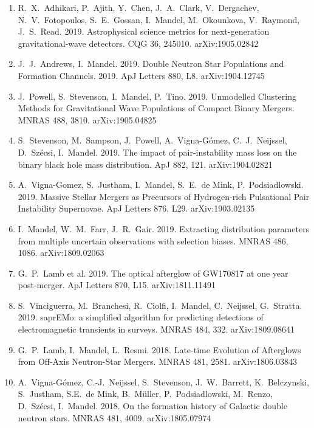 \documentclass[margin,line]{res}
\begin{document}
\begin{resume}
\begin{enumerate}
\item R.~X.~Adhikari, P.~Ajith, Y.~Chen, J.~A.~Clark, V.~Dergachev, N.~V.~Fotopoulos, S.~E.~Gossan, I.~Mandel, M.~Okounkova, V.~Raymond, J.~S.~Read.  2019. Astrophysical science metrics for next-generation gravitational-wave detectors.  CQG 36, 245010.  arXiv:1905.02842

\item J.~J.~Andrews, I.~Mandel. 2019. Double Neutron Star Populations and Formation Channels.   2019.  ApJ Letters 880, L8.  arXiv:1904.12745

\item J.~Powell, S.~Stevenson, I.~Mandel, P.~Tino.  2019.  Unmodelled Clustering Methods for Gravitational Wave Populations of Compact Binary Mergers.  MNRAS 488, 3810. arXiv:1905.04825

\item S.~Stevenson, M.~Sampson, J.~Powell, A.~Vigna-G\'{o}mez, C.~J.~Neijssel, D.~Sz\'{e}csi, I.~Mandel.  2019. The impact of pair-instability mass loss on the binary black hole mass distribution.   ApJ 882, 121.  arXiv:1904.02821 

\item A.~Vigna-Gomez, S.~Justham, I.~Mandel, S.~E.~de Mink, P.~Podsiadlowski.  2019.  Massive Stellar Mergers as Precursors of Hydrogen-rich Pulsational Pair Instability Supernovae.  ApJ Letters 876, L29. arXiv:1903.02135

\item I.~Mandel, W.~M.~Farr, J.~R.~Gair.  2019. Extracting distribution parameters from multiple uncertain observations with selection biases.  MNRAS 486, 1086.  arXiv:1809.02063

\item G.~P.~Lamb et al. 2019. The optical afterglow of GW170817 at one year post-merger.  ApJ Letters 870, L15. arXiv:1811.11491

\item S.~Vinciguerra, M.~Branchesi, R.~Ciolfi, I.~Mandel, C.~Neijssel, G.~Stratta.  2019. saprEMo: a simplified algorithm for predicting detections of electromagnetic transients in surveys.  MNRAS 484, 332.  arXiv:1809.08641

\item G.~P.~Lamb, I.~Mandel, L.~Resmi.  2018.  Late-time Evolution of Afterglows from Off-Axis Neutron-Star Mergers.  MNRAS 481, 2581.  arXiv:1806.03843

\item A.~Vigna-G\'{o}mez, C.-J.~Neijssel, S.~Stevenson, J.~W.~Barrett, K.~Belczynski, S.~Justham, S.E.~de Mink, B.~M{\"u}ller, P.~Podsiadlowski, M.~Renzo, D.~Sz{\'e}csi, I.~Mandel.  2018. On the formation history of Galactic double neutron stars.  MNRAS 481, 4009. arXiv:1805.07974


\end{enumerate}
\end{resume}
\end{document}
